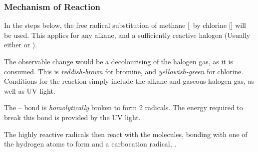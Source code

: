 	\subsubsection{Mechanism of Reaction}

		In the steps below, the free radical substitution of methane [\ by chlorine [\ce{\chlorine}] will be used. This applies
		for any alkane, and a sufficiently reactive halogen (Usually either \ce{\chlorine} or ).

		The observable change would be a decolourising of the halogen gas, as it is consumed. This is \textit{reddish-brown} for bromine,
		and \textit{yellowish-green} for chlorine. Conditions for the reaction simply include the alkane and gaseous halogen gas,
		as well as UV light.


			The \ce{\chlorine}–\ce{\chlorine} bond is \textit{homolytically} broken to form 2 \ce{\chlorine} radicals.
			The energy required to break this bond is provided by the UV light.




			The highly reactive \ce{\chlorine} radicals then react with the  molecules, bonding with one of the
			hydrogen atoms to form  and a carbocation radical, .


